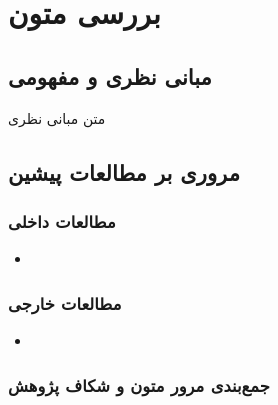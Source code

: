 
\chapter{بررسی متون}

\section{مبانی نظری و مفهومی}
متن مبانی نظری
\section{مروری بر مطالعات پیشین}

\subsection{مطالعات داخلی}
\begin{itemize}
  \item
\end{itemize}

\subsection{مطالعات خارجی}
\begin{itemize}
  \item
\end{itemize}

\subsection{جمع‌بندی مرور متون و شکاف پژوهش}

\clearpage
